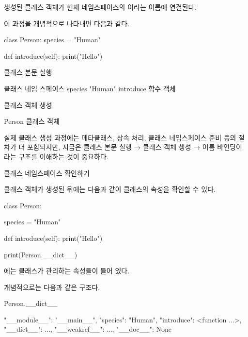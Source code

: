 생성된 클래스 객체가 현재 네임스페이스의 이라는 이름에 연결된다.

이 과정을 개념적으로 나타내면 다음과 같다.

\begin{dhksmry}
                class Person:
                    species = "Human"

                    def introduce(self):
                        print("Hello")

                            \da

                    클래스 본문 실행

                            \da
                    
                    클래스 네임 스페이스
                        species   \ra "Human"
                        introduce \ra 함수 객체

                            \da
                    
                    클래스 객체 생성

                            \da

                    Person \ra 클래스 객체
\end{dhksmry}

실제 클래스 생성 과정에는 메타클래스, 상속 처리, 클래스 네임스페이스 준비 등의 절차가 더 포함되지만, 지금은 클래스 본문 실행 → 클래스 객체 생성 → 이름 바인딩이라는 구조를 이해하는 것이 중요하다.

\begin{dhknote}
\begin{dhksmry}[centered]
클래스 네임스페이스 확인하기
\end{dhksmry}
\end{dhknote}

클래스 객체가 생성된 뒤에는 다음과 같이 클래스의 속성을 확인할 수 있다.

\begin{dhkcode}
class Person:

    species = "Human"

    def introduce(self):
        print("Hello")


print(Person.__dict__)
\end{dhkcode}

에는 클래스가 관리하는 속성들이 들어 있다.

개념적으로는 다음과 같은 구조다.

\begin{dhkzsh}
Person.__dict__

{
    "__module__": "__main__",
    "species": "Human",
    "introduce": <function ...>,
    "__dict__": ...,
    "__weakref__": ...,
    "__doc__": None
}
\end{dhkzsh}

